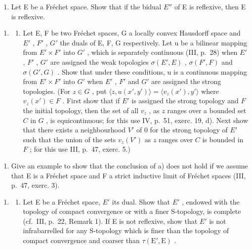 \begin{enumerate}
\def\labelenumi{\alph{enumi})}
\setcounter{enumi}{1}
\tightlist
\item
  Let E be a Fréchet space. Show that if the bidual \(E''\) of E is reflexive, then E is reflexive.
\end{enumerate}

\begin{enumerate}
\def\labelenumi{\arabic{enumi})}
\setcounter{enumi}{12}
\tightlist
\item
  \begin{enumerate}
  \def\labelenumii{\alph{enumii})}
  \tightlist
  \item
    Let E, F be two Fréchet spaces, G a locally convex Hausdorff space and \(E'\) , \(F'\) , \(G'\) the duals of E, F, G respectively. Let u be a bilinear mapping from \(E' \times F'\) into \(G'\) , which is separately continuous (III, p.~28) when \(E'\) , \(F'\) , \(G'\) are assigned the weak topologies \(\sigma(E', E)\) , \(\sigma(F', F)\) and \(\sigma(G', G)\) . Show that under these conditions, u is a continuous mapping from \(E' \times F'\) into \(G'\) when \(E'\) , \(F'\) and \(G'\) are assigned the strong topologies. (For \(z \in G\) , put \(\langle z, u(x', y') \rangle = \langle v_z(x'), y' \rangle\) where \(v_z(x') \in F\) . First show that if \(E'\) is assigned the strong topology and \(F\) the initial topology, then the set of all \(v_z\) , as \(z\) ranges over a bounded set \(C\) in \(G\) , is equicontinuous; for this use IV, p.~51, exerc. 19, d). Next show that there exists a neighbourhood \(V'\) of 0 for the strong topology of \(E'\) such that the union of the sets \(v_z(V')\) as \(z\) ranges over \(C\) is bounded in \(F\) ; for this use III, p.~47, exerc. 5.)
  \end{enumerate}
\end{enumerate}

\begin{enumerate}
\def\labelenumi{\alph{enumi})}
\setcounter{enumi}{1}
\tightlist
\item
  Give an example to show that the conclusion of a) does not hold if we assume that E is a Fréchet space and F a strict inductive limit of Fréchet spaces (III, p.~47, exerc. 3).
\end{enumerate}

\begin{enumerate}
\def\labelenumi{\arabic{enumi})}
\setcounter{enumi}{13}
\tightlist
\item
  \begin{enumerate}
  \def\labelenumii{\alph{enumii})}
  \tightlist
  \item
    Let E be a Fréchet space, \(E'\) its dual. Show that \(E'\) , endowed with the topology of compact convergence or with a finer S-topology, is complete (cf.~III, p.~22, Remark 1). If E is not reflexive, show that \(E'\) is not infrabarrelled for any S-topology which is finer than the topology of compact convergence and coarser than \(\tau(\mathrm{E}', \mathrm{E})\) .
  \end{enumerate}
\end{enumerate}

